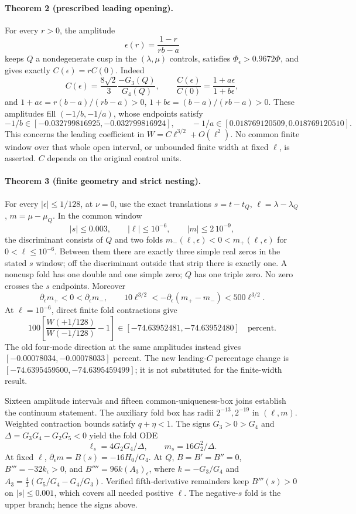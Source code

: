 \paragraph{Theorem 2 (prescribed leading opening).}
For every $r>0$, the amplitude
\[
 \epsilon(r)=\frac{1-r}{rb-a}
\]
keeps $Q$ a nondegenerate cusp in the $(\lambda,\mu)$ controls,
satisfies $\Phi_\epsilon>0.9672\Phi$, and gives exactly
$C(\epsilon)=rC(0)$. Indeed
\[
 C(\epsilon)=\frac{8\sqrt2}{3}\frac{-G_3(Q)}{G_4(Q)},\qquad
 \frac{C(\epsilon)}{C(0)}=\frac{1+a\epsilon}{1+b\epsilon},
\]
and $1+a\epsilon=r(b-a)/(rb-a)>0$,
$1+b\epsilon=(b-a)/(rb-a)>0$. These amplitudes fill
$(-1/b,-1/a)$, whose endpoints satisfy
\[
 -1/b\in[-0.032799816925,-0.032799816924],\qquad
 -1/a\in[0.018769120509,0.018769120510].
\]
This concerns the leading coefficient in
$W=C\ell^{3/2}+O(\ell^2)$. No common finite window over that
whole open interval, or unbounded finite width at fixed $\ell$,
is asserted. $C$ depends on the original control units.

\paragraph{Theorem 3 (finite geometry and strict nesting).}
For every $|\epsilon|\leq1/128$, at $\nu=0$, use the exact
translations $s=t-t_Q$, $\ell=\lambda-\lambda_Q$, $m=\mu-\mu_Q$.
In the common window
\[
 |s|\leq0.003,\qquad |\ell|\leq10^{-6},\qquad |m|\leq2\,10^{-9},
\]
the discriminant consists of $Q$ and two folds
$m_-(\ell,\epsilon)<0<m_+(\ell,\epsilon)$ for
$0<\ell\leq10^{-6}$. Between them there are exactly three
simple real zeros in the stated $s$ window; off the discriminant
outside that strip there is exactly one. A noncusp fold has one
double and one simple zero; $Q$ has one triple zero. No zero
crosses the $s$ endpoints. Moreover
\[
 \partial_\epsilon m_+<0<\partial_\epsilon m_-,\qquad
 10\ell^{3/2}<-\partial_\epsilon(m_+-m_-)<500\ell^{3/2}.
\]
At $\ell=10^{-6}$, direct finite fold contractions give
\[
 100\left[\frac{W(+1/128)}{W(-1/128)}-1\right]
 \in[-74.63952481,-74.63952480]\quad\text{percent}.
\]
The old four-mode direction at the same amplitudes instead gives
$[-0.00078034,-0.00078033]$ percent. The new leading-$C$
percentage change is $[-74.6395459500,-74.6395459499]$;
it is not substituted for the finite-width result.

Sixteen amplitude intervals and fifteen common-uniqueness-box
joins establish the continuum statement. The auxiliary fold
box has radii $2^{-13},2^{-19}$ in $(\ell,m)$.
Weighted contraction bounds satisfy $q+\eta<1$. The signs
$G_3>0>G_4$ and $\Delta=G_3G_4-G_2G_5<0$ yield the fold ODE
\[
 \ell_s=4G_2G_4/\Delta,\qquad m_s=16G_2^2/\Delta.
\]
At fixed $\ell$, $\partial_\epsilon m=B(s)=-16H_0/G_4$.
At $Q$, $B=B'=B''=0$,
$B'''=-32k_\epsilon>0$, and
$B''''=96k(A_3)_\epsilon$, where
$k=-G_3/G_4$ and $A_3=\frac43(G_5/G_4-G_4/G_3)$.
Verified fifth-derivative remainders keep $B'''(s)>0$ on
$|s|\leq0.001$, which covers all needed positive $\ell$.
The negative-$s$ fold is the upper branch; hence the signs above.


